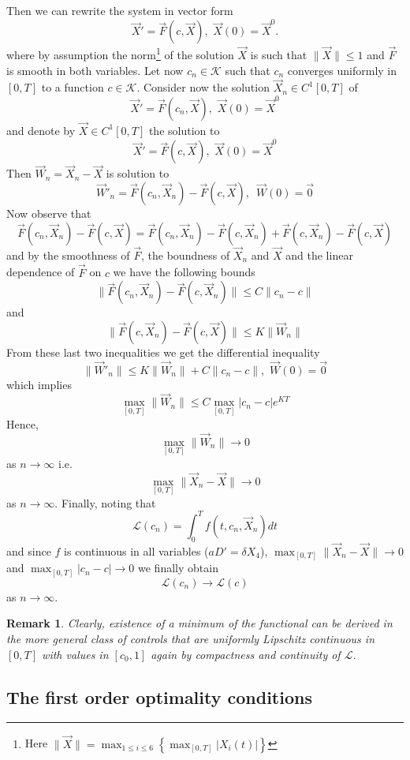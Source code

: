 \documentclass{amsart}
\newtheorem{rem}[teo]{Remark}
\begin{document}
Then we can rewrite the system in vector form
$$
\Vec{X}'=\Vec{F}(c,\Vec{X}),\,\, \Vec{X}(0)=\Vec{X}^0.
$$
where by assumption the norm\footnote{Here $\|\Vec{X}\|=\max_{1\leq i\leq6}\left\{\max_{[0,T]}|X_i(t)|\right\}$} of the solution $\vec{X}$ is such that $\|\Vec{X}\|\leq 1$ and $\Vec{F}$ is smooth in both variables.
Let now $c_n\in \mathcal{K}$ such that $c_n$ converges uniformly in $[0,T]$ to a function $c\in \mathcal{K}$.
Consider now the solution $\Vec{X}_n\in C^1[0,T]$ of
$$
\Vec{X}'=\Vec{F}(c_n,\Vec{X}),\,\, \Vec{X}(0)=\Vec{X}^0
$$
and denote by $\Vec{X}\in C^1[0,T]$ the solution to 
$$
\Vec{X}'=\Vec{F}(c,\Vec{X}),\,\, \Vec{X}(0)=\Vec{X}^0
$$
Then $\Vec{W}_n=\Vec{X}_n-\Vec{X}$ is solution to 
$$
\Vec{W}'_n=\Vec{F}(c_n,\Vec{X}_n)-\Vec{F}(c,\Vec{X}),\,\,\,\Vec{W}(0)=\Vec{0}
$$
Now observe that 
$$
\Vec{F}(c_n,\Vec{X}_n)-\Vec{F}(c,\Vec{X})=\Vec{F}(c_n,\Vec{X}_n)-
\Vec{F}(c,\Vec{X}_n)+\Vec{F}(c,\Vec{X}_n)-\Vec{F}(c,\Vec{X})
$$
and by the smoothness of $\Vec{F}$, the boundness of $\Vec{X}_n$ and $\Vec{X}$ and the linear dependence of $\Vec{F}$ on $c$ we have the following bounds
$$
\|\Vec{F}(c_n,\Vec{X}_n)-\Vec{F}(c,\Vec{X}_n)\|\leq C\|c_n-c\|
$$
and 
$$
\|\Vec{F}(c,\Vec{X}_n)-\Vec{F}(c,\Vec{X})\|\leq K \|\Vec{W}_n\|
$$
From these last two inequalities we get the differential inequality 
$$
\|\Vec{W}'_n\|\leq K\|\Vec{W}_n\|+C\|c_n-c\|,\,\,\Vec{W}(0)=\Vec{0}
$$
which implies
$$
\max_{[0,T]}\|\Vec{W}_n\|\leq C\max_{[0,T]}|c_n-c|e^{KT}
$$
Hence, 
$$\max_{[0,T]}\|\Vec{W}_n\|\rightarrow 0$$ 
as $n\rightarrow \infty$ i.e. $$\max_{[0,T]}\|\Vec{X}_n-\Vec{X}\|\rightarrow 0$$ 
as $n\rightarrow \infty$.
Finally, noting that 
$$
\mathcal{L}(c_n)=\int_0^Tf(t,c_n,\Vec{X}_n)dt
$$
and since $f$  is continuous in all variables ($a D'=\delta X_4$),  $\max_{[0,T]}\|\Vec{X}_n-\Vec{X}\|\rightarrow 0$ and $\max_{[0,T]}|c_n-c|\rightarrow 0$  we finally obtain
$$
\mathcal{L}(c_n)\rightarrow \mathcal{L}(c)
$$ 
as $n\rightarrow \infty$.
\begin{rem} Clearly, existence of a minimum of the functional can be derived  in the more general class of controls that are uniformly Lipschitz continuous in $[0,T]$ with values in $[c_0,1]$ again by compactness and continuity of $\mathcal{L}$. 
\end{rem}

\subsection{The first order optimality conditions} \label{pontriagyn}
\end{document}
